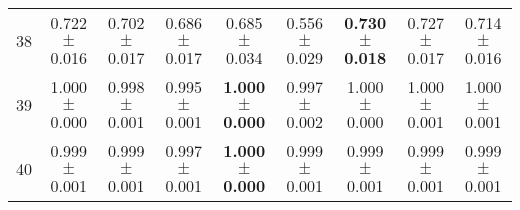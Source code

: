 \begin{table}[!ht]
{\begin{tabular}{r c c c c c c c c}
38 & 0.722 $\pm$ 0.016 & 0.702 $\pm$ 0.017 & 0.686 $\pm$ 0.017 & 0.685 $\pm$ 0.034 & 0.556 $\pm$ 0.029 & \textbf{0.730 $\pm$ 0.018} & 0.727 $\pm$ 0.017 & 0.714 $\pm$ 0.016 \\
39 & 1.000 $\pm$ 0.000 & 0.998 $\pm$ 0.001 & 0.995 $\pm$ 0.001 & \textbf{1.000 $\pm$ 0.000} & 0.997 $\pm$ 0.002 & 1.000 $\pm$ 0.000 & 1.000 $\pm$ 0.001 & 1.000 $\pm$ 0.001 \\
40 & 0.999 $\pm$ 0.001 & 0.999 $\pm$ 0.001 & 0.997 $\pm$ 0.001 & \textbf{1.000 $\pm$ 0.000} & 0.999 $\pm$ 0.001 & 0.999 $\pm$ 0.001 & 0.999 $\pm$ 0.001 & 0.999 $\pm$ 0.001 \\
\end{tabular}}
\end{table}
